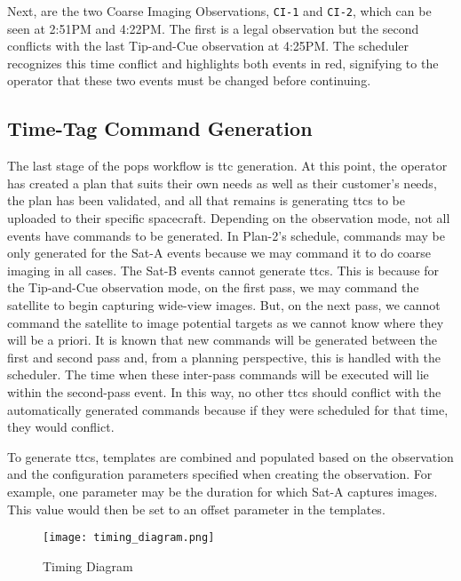 Next, are the two Coarse Imaging Observations, \texttt{CI-1} and \texttt{CI-2},
which can be seen at 2:51PM and 4:22PM\@. The first is a legal observation but
the second conflicts with the last Tip-and-Cue observation at 4:25PM\@. The
scheduler recognizes this time conflict and highlights both events in red,
signifying to the operator that these two events must be changed before
continuing.

\subsection{Time-Tag Command Generation}\label{sec:ttc-gen}

The last stage of the \gls{pops} workflow is \gls{ttc} generation.  At this
point, the operator has created a plan that suits their own needs as well as
their customer’s needs, the plan has been validated, and all that remains is
generating \glspl{ttc} to be uploaded to their specific spacecraft.  Depending
on the observation mode, not all events have commands to be generated. In
Plan-2's schedule, commands may be only generated for the Sat-A events because
we may command it to do coarse imaging in all cases. The Sat-B events cannot
generate \glspl{ttc}. This is because for the Tip-and-Cue observation mode, on
the first pass, we may command the satellite to begin capturing wide-view
images.  But, on the next pass, we cannot command the satellite to image
potential targets as we cannot know where they will be a priori. It is known
that new commands will be generated between the first and second pass and, from
a planning perspective, this is handled with the scheduler. The time when these
inter-pass commands will be executed will lie within the second-pass event. In
this way, no other \glspl{ttc} should conflict with the automatically generated
commands because if they were scheduled for that time, they would conflict. 

To generate \glspl{ttc}, templates are combined and populated based on the
observation and the configuration parameters specified when creating the
observation. For example, one parameter may be the duration for which Sat-A
captures images. This value would then be set to an offset parameter in the
templates. 

\begin{figure}[h] 
    \centering
    \texttt{[image: timing\_diagram.png]} 
    \label{fig:timing} 
    \caption{Timing Diagram}
\end{figure}

